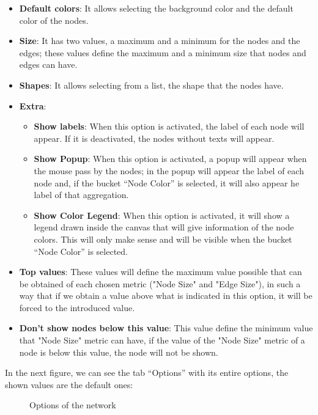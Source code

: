 \documentclass[a4paper, 12pt]{book}
\begin{document}
\begin{itemize}
\item \textbf{Default colors}: It allows selecting the background color and the default color of the nodes.
\item \textbf{Size}: It has two values, a maximum and a minimum for the nodes and the edges; these values define the maximum and a minimum size that nodes and edges can have.
\item \textbf{Shapes}: It allows selecting from a list, the shape that the nodes have.
\item \textbf{Extra}: 
\begin{itemize}
\item \textbf{Show labels}: When this option is activated, the label of each node will appear. If it is deactivated, the nodes without texts will appear.
\item \textbf{Show Popup}: When this option is activated, a popup will appear when the mouse pass by the nodes; in the popup will appear the label of each node and, if the bucket “Node Color” is selected, it will also appear he label of that aggregation.
\item \textbf{Show Color Legend}: When this option is activated, it will show a legend drawn inside the canvas that will give information of the node colors. This will only make sense and will be visible when the bucket “Node Color” is selected. 
\end{itemize}
\item \textbf{Top values}: These values will define the maximum value possible that can be obtained of each chosen metric ("Node Size" and "Edge Size"), in such a way that if we obtain a value above what is indicated in this option, it will be forced to the introduced value.
\item \textbf{Don't show nodes below this value}: This value define the minimum value that "Node Size" metric can have, if the value of the "Node Size" metric of a node is below this value, the node will not be shown.
\end{itemize}

In the next figure, we can see the tab “Options” with its entire options, the shown values are the default ones:

\begin{figure}[H]
 \centering
 \caption{Options of the network}
 \label{f:optionsnetwork}
\end{figure}
\end{document}

